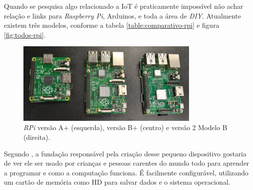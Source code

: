 \documentclass[
		12pt,				%
		openright,			%
		oneside,			%
		a4paper,			%
		chapter=TITLE,		%
		english,			%
		brazil				%
	]{abntex2}
\begin{document}
Quando se pesquisa algo relacionado a IoT é praticamente impossível não achar relação e links para \textit{Raspberry Pi}, Arduinos, e toda a área de \textit{DIY}. Atualmente existem três modelos, conforme a tabela \autoref{table:comparativo-rpi} e figura \autoref{fig:todos-rpi}. 

\begin{figure}[htb]
	\caption{\label{fig:todos-rpi}\textit{RPi} versão A+ (esquerda), versão B+ (centro) e versão 2 Modelo B (direita).}
	\begin{center}
		\includegraphics[width=0.8\textwidth]{img/rpi-modelos.jpg}
	\end{center}
\end{figure}

\begin{table}[htb]
\end{table}

Segundo , a fundação responsável pela criação desse pequeno dispositivo gostaria de ver ele ser usado por crianças e pessoas carentes do mundo todo para aprender a programar e como a computação funciona. É facilmente configurável, utilizando um cartão de memória como HD para salvar dados e o sistema operacional.
\end{document}
